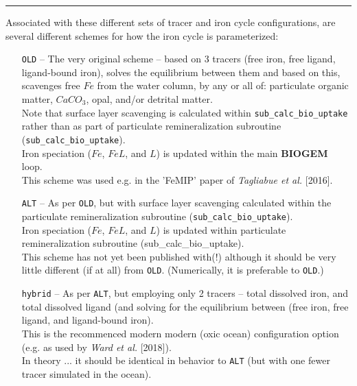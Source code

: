 \vspace{1mm}
\noindent\rule{4cm}{0.5pt}
\vspace{2mm}

\noindent Associated with these different sets of tracer and iron cycle configurations, are several different schemes for how the iron cycle is parameterized:

\begin{itemize}[noitemsep]
\vspace{1mm}
\item [\texttt{OLD}] -- The very original scheme -- based on 3 tracers (free iron, free ligand, ligand-bound iron), solves the equilibrium between them and based on this, scavenges free \(Fe\) from the water column, by any or all of: particulate organic matter, \(CaCO_{3}\), opal, and/or detrital matter.
\\Note that surface layer scavenging is calculated within \texttt{sub\_calc\_bio\_uptake} rather than as part of particulate remineralization subroutine (\texttt{sub\_calc\_bio\_uptake}).
\\Iron speciation (\(Fe\), \(FeL\), and \(L\)) is updated within the main \textbf{BIOGEM} loop.
\\This scheme  was used e.g. in the 'FeMIP' paper of \textit{Tagliabue et al.} [2016].
\vspace{1mm}
\item [\texttt{ALT}] -- As per \texttt{OLD}, but with surface layer scavenging  calculated within the particulate remineralization subroutine (\texttt{sub\_calc\_bio\_uptake}).
\\Iron speciation (\(Fe\), \(FeL\), and \(L\)) is updated within  particulate remineralization subroutine (sub\_calc\_bio\_uptake).
\\This scheme has not yet been published with(!) although it should be very little different (if at all) from \texttt{OLD}. (Numerically, it is preferable to \texttt{OLD}.) 
\vspace{1mm}
\item [\texttt{hybrid}] -- As per \texttt{ALT}, but employing only 2 tracers -- total dissolved iron, and total dissolved ligand (and solving for the equilibrium between (free iron, free ligand, and ligand-bound iron).
\\This is the recommenced modern modern (oxic ocean) configuration option (e.g. as used by \textit{Ward et al.} [2018]). 
\\In theory ... it should be identical in behavior to \texttt{ALT} (but with one fewer tracer simulated in the ocean).

\end{itemize}
